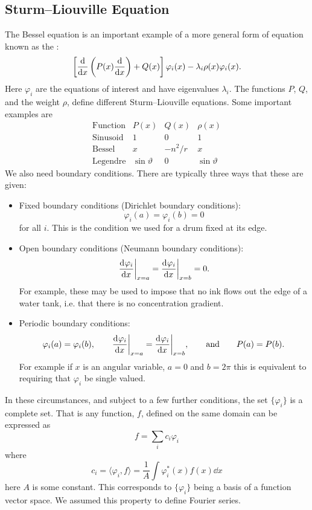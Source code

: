 \documentclass[a4paper]{article}
\begin{document}
    \subsection{Sturm--Liouville Equation}
    The Bessel equation is an important example of a more general form of equation known as the :
    \[\left[\dv{x}\left(P(x)\dv{x}\right) + Q(x)\right]\varphi_i(x) - \lambda_i\rho(x)\varphi_i(x).\]
    Here \(\varphi_i\) are the equations of interest and have eigenvalues \(\lambda_i\).
    The functions \(P\), \(Q\), and the weight \(\rho\), define different Sturm--Liouville equations.
    Some important examples are
    \[
        \begin{array}{lccc}
            \text{Function} & P(x) & Q(x) & \rho(x)\\
            \text{Sinusoid} & 1 & 0 & 1\\
            \text{Bessel} & x & -n^2/r & x\\
            \text{Legendre} & \sin\vartheta & 0 & \sin\vartheta
        \end{array}
    \]
    We also need boundary conditions.
    There are typically three ways that these are given:
    \begin{itemize}
        \item Fixed boundary conditions (Dirichlet boundary conditions):
        \[\varphi_i(a) = \varphi_i(b) = 0\]
        for all \(i\).
        This is the condition we used for a drum fixed at its edge.
        \item Open boundary conditions (Neumann boundary conditions):
        \[\dv[]{\varphi_i}{x}\biggr|_{x=a} = \dv[]{\varphi_i}{x}\biggr|_{x=b} = 0.\]
        For example, these may be used to impose that no ink flows out the edge of a water tank, i.e. that there is no concentration gradient.
        \item Periodic boundary conditions:
        \[\varphi_i(a) = \varphi_i(b), \qquad \dv[]{\varphi_i}{x}\biggr|_{x=a} = \dv[]{\varphi_i}{x}\biggr|_{x=b}, \qquad\text{and}\qquad P(a) = P(b).\]
        For example if \(x\) is an angular variable, \(a = 0\) and \(b = 2\pi\) this is equivalent to requiring that \(\varphi_i\) be single valued.
    \end{itemize}
    In these circumstances, and subject to a few further conditions, the set \(\{\varphi_i\}\) is a complete set.
    That is any function, \(f\), defined on the same domain can be expressed as
    \[f = \sum_{i}c_i\varphi_i\]
    where
    \[c_i = \langle \varphi_i , f \rangle = \frac{1}{A}\int \varphi_i^*(x)f(x) \dd{x}\]
    here \(A\) is some constant.
    This corresponds to \(\{\varphi_i\}\) being a basis of a function vector space.
    We assumed this property to define Fourier series.
    
\end{document}
